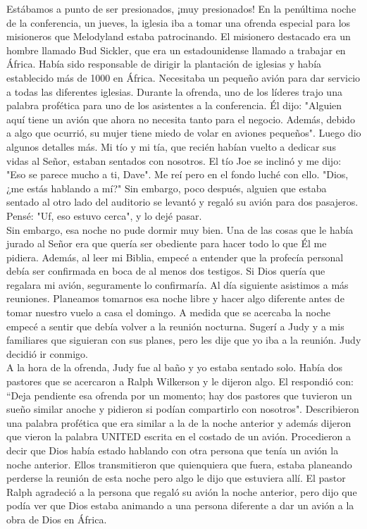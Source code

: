 \documentclass[twoside, 12pt]{book}
\begin{document}
Estábamos a punto de ser presionados, ¡muy presionados! En la penúltima noche de la conferencia, un jueves, la iglesia iba a tomar una ofrenda especial para los misioneros que Melodyland estaba patrocinando. El misionero destacado era un hombre llamado Bud Sickler, que era un estadounidense llamado a trabajar en África. Había sido responsable de dirigir la plantación de iglesias y había establecido más de 1000 en África. Necesitaba un pequeño avión para dar servicio a todas las diferentes iglesias. Durante la ofrenda, uno de los líderes trajo una palabra profética para uno de los asistentes a la conferencia. Él dijo: "Alguien aquí tiene un avión que ahora no necesita tanto para el negocio. Además, debido a algo que ocurrió, su mujer tiene miedo de volar en aviones pequeños". Luego dio algunos detalles más. Mi tío y mi tía, que recién habían vuelto a dedicar sus vidas al Señor, estaban sentados con nosotros. El tío Joe se inclinó y me dijo: "Eso se parece mucho a ti, Dave". Me reí pero en el fondo luché con ello. "Dios, ¿me estás hablando a mí?" Sin embargo, poco después, alguien que estaba sentado al otro lado del auditorio se levantó y regaló su avión para dos pasajeros. Pensé: "Uf, eso estuvo cerca", y lo dejé pasar.\\

Sin embargo, esa noche no pude dormir muy bien. Una de las cosas que le había jurado al Señor era que quería ser obediente para hacer todo lo que Él me pidiera. Además, al leer mi Biblia, empecé a entender que la profecía personal debía ser confirmada en boca de al menos dos testigos. Si Dios quería que regalara mi avión, seguramente lo confirmaría. Al día siguiente asistimos a más reuniones. Planeamos tomarnos esa noche libre y hacer algo diferente antes de tomar nuestro vuelo a casa el domingo. A medida que se acercaba la noche empecé a sentir que debía volver a la reunión nocturna. Sugerí a Judy y a mis familiares que siguieran con sus planes, pero les dije que yo iba a la reunión. Judy decidió ir conmigo.\\

A la hora de la ofrenda, Judy fue al baño y yo estaba sentado solo. Había dos pastores que se acercaron a Ralph Wilkerson y le dijeron algo. El respondió con: “Deja pendiente esa ofrenda por un momento; hay dos pastores que tuvieron un sueño similar anoche y pidieron si podían compartirlo con nosotros". Describieron una palabra profética que era similar a la de la noche anterior y además dijeron que vieron la palabra UNITED escrita en el costado de un avión. Procedieron a decir que Dios había estado hablando con otra persona que tenía un avión la noche anterior. Ellos transmitieron que quienquiera que fuera, estaba planeando perderse la reunión de esta noche pero algo le dijo que estuviera allí. El pastor Ralph agradeció a la persona que regaló su avión la noche anterior, pero dijo que podía ver que Dios estaba animando a una persona diferente a dar un avión a la obra de Dios en África.\\
\end{document}
